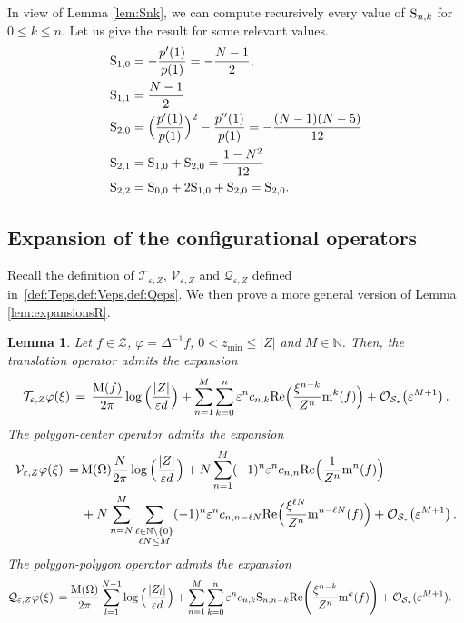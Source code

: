 \documentclass[11pt,reqno,a4paper]{amsart}
\def\eps{\varepsilon}
\def\epsilon{\varepsilon}
\def\NN {\mathbb{N}}
\def\Re{{\rm Re}}
\newcommand{\cO}{\mathcal{O}}
\newcommand{\cQ}{\mathcal{Q}}
\newcommand{\cS}{\mathcal{S}}
\newcommand{\cT}{\mathcal{T}}
\newcommand{\cV}{\mathcal{V}}
\newcommand{\cZ}{\mathcal{Z}}
\newcommand{\mrm}{\mathrm{m}}
\newcommand{\mrM}{\mathrm{M}}
\newcommand{\1}{\mathbbm{1}}
\newtheorem{lemma}[proposition]{Lemma}
\theoremstyle{definition}
\theoremstyle{definition}
\numberwithin{equation}{section}
\begin{document}
In view of Lemma \ref{lem:Snk}, we can compute recursively every value of ${\rm S}_{n,k}$ for $0 \le k \le n$. Let us give the result for some relevant values.
\begin{align}
    &{\rm S}_{1,0}=-\frac{p'(1)}{p(1)}=-\frac{N-1}{2}, \\
    &{\rm S}_{1,1}=\frac{N-1}{2}\label{eq:S11}\\
    &{\rm S}_{2,0}=\Big(\frac{p'(1)}{p(1)}\Big)^2-\frac{p''(1)}{p(1)}=-\frac{(N-1)(N-5)}{12}\\
    &{\rm S}_{2,1}={\rm S}_{1,0}+{\rm S}_{2,0}=\frac{1-N^2}{12}\\
    &{\rm S}_{2,2}={\rm S}_{0,0}+2{\rm S}_{1,0}+{\rm S}_{2,0}={\rm S}_{2,0}.\label{eq:S22}
\end{align}



\subsection{Expansion of the configurational operators}


Recall the definition of $\cT_{\eps,Z}$, $\cV_{\eps,Z}$ and $\cQ_{\eps,Z}$ defined in~\cref{def:Teps,def:Veps,def:Qeps}.
We then prove a more general version of Lemma \ref{lem:expansionsR}.
\begin{lemma}\label{lem:Expansions}
    Let $f \in \cZ$,  $\varphi = \Delta^{-1}f$, $0<z_{\min}\leq |Z|$ and $M\in \NN$. Then, the translation operator admits the expansion
    \begin{equation}
        \cT_{\eps,Z}\varphi(\xi) \,=\, \frac{{\rm M}(f)}{2\pi}\log\Big(\frac{|Z|}{\eps d}\Big)
    +\sum_{n=1}^M\sum_{k=0}^{n} \eps^nc_{n,k} \Re\Big(\frac{\xi^{n-k}}{Z^n}{\rm m}^k(f)\Big) + \cO_{\cS_*}\bigl(\epsilon^{M+1}\bigr)\,.
    \end{equation}
    The polygon-center operator admits the expansion
    \begin{equation}
  \begin{split}
      \cV_{\eps,Z}\varphi(\xi) \,=\,& \mrM(\Omega)\frac{N}{2\pi}\log\Big(\frac{|Z|}{\eps d}\Big)
  +N\sum_{n=1}^M (-1)^n\eps^nc_{n,n} \Re\Big(\frac{1}{Z^n}{\rm m}^n(f)\Big)\\
&+N\sum_{n=N}^M\sum_{\substack{\ell \in \mathbb{N}\setminus \{0\}\\
\ell N\leq M}}(-1)^n\eps^n c_{n,n-\ell N} \Re\Big(\frac{\xi^{\ell N}}{Z^n}\mrm^{n-\ell N}(f)\Big)+\cO_{\cS_*}\bigl(\epsilon^{M+1}\bigr)\,.
        \end{split}
\end{equation}
    The polygon-polygon operator admits the expansion
\begin{equation}
  \begin{split}
\cQ_{\eps,Z}\varphi(\xi) \,=&\, \frac{\mrM(\Omega)}{2\pi}\sum_{l=1}^{N-1}\log\Big(\frac{|Z_l|}{\eps d}\Big)
  +\sum_{n=1}^M \sum_{k=0}^n\epsilon^nc_{n,k}{\rm S}_{n,n-k}\Re\Bigg(\frac{\xi^{n-k}}{Z^n}\mrm^k(f)\Bigg)+\cO_{\cS_*}(\eps^{M+1}).
        \end{split}
\end{equation}
\end{lemma}
\end{document}

